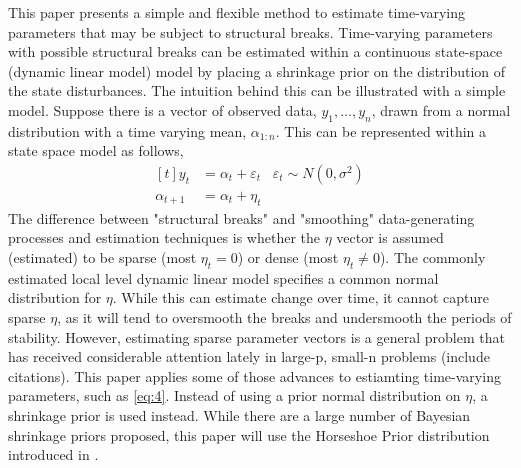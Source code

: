 \documentclass{article}
\begin{document}
This paper presents a simple and flexible method to estimate time-varying parameters that may be subject to structural breaks.
Time-varying parameters with possible structural breaks can be estimated within a continuous state-space (dynamic linear model) model by placing a shrinkage prior on the distribution of the state disturbances.
The intuition behind this can be illustrated with a simple model.
Suppose there is a vector of observed data, $y_{1}, \dots, y_{n}$, drawn from a normal distribution with a time varying mean, $\alpha_{1:n}$. 
This can be represented within a state space model as follows,
\begin{equation}
  \label{eq:4}
  \begin{aligned}[t]
    y_{t} &= \alpha_{t} + \varepsilon_{t} & \varepsilon_{t} \sim N(0, \sigma^{2}) \\
    \alpha_{t + 1} &= \alpha_{t} + \eta_{t}
  \end{aligned}
\end{equation}
The difference between "structural breaks" and "smoothing" data-generating processes and estimation techniques is whether the $\eta$ vector is assumed (estimated) to be sparse (most $\eta_{t} = 0$) or dense (most $\eta_{t} \neq 0$).
The commonly estimated local level dynamic linear model specifies a common normal distribution for $\eta$.
While this can estimate change over time, it cannot capture sparse $\eta$, as it will tend to oversmooth the breaks and undersmooth the periods of stability.
However, estimating sparse parameter vectors is a general problem that has received considerable attention lately in large-p, small-n problems (include citations).
This paper applies some of those advances to estiamting time-varying parameters, such as \eqref{eq:4}.
Instead of using a prior normal distribution on $\eta$, a shrinkage prior is used instead.
While there are a large number of Bayesian shrinkage priors proposed, this paper will use the Horseshoe Prior distribution introduced in \textcites{CarvalhoPolsonScott2009}{CarvalhoPolsonScott2010}.
\end{document}

